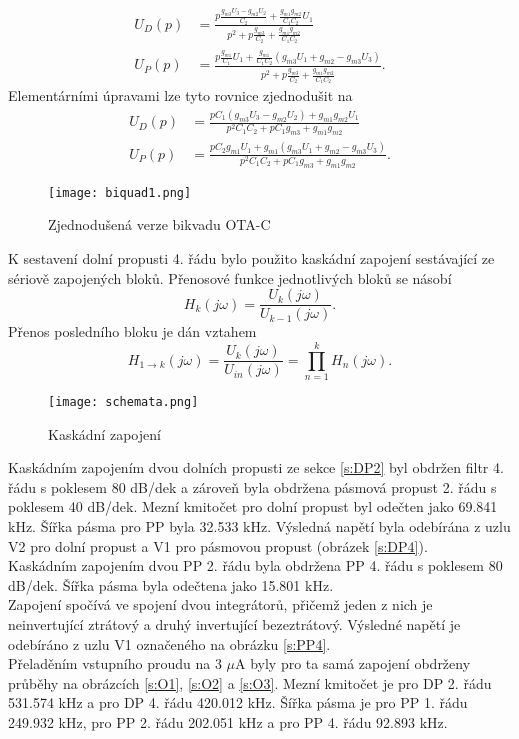 \begin{align}
U_D(p) &= \frac{p\frac{g_{m3}U_3-g_{m2}U_2}{C_2}+\frac{g_{m1}g_{m2}}{C_1C_2}U_1}{p^2 + p\frac{g_{m3}}{C_2} + \frac{g_{m1}g_{m2}}{C_1C_2}}\\
U_P(p) &= \frac{p\frac{g_{m1}}{C_1}U_1 + \frac{g_{m1}}{C_1C_2}(g_{m3}U_1+g_{m2}-g_{m3}U_3)}{p^2 + p\frac{g_{m3}}{C_2} + \frac{g_{m1}g_{m2}}{C_1C_2}}.
\end{align}
\noindent Elementárními úpravami lze tyto rovnice zjednodušit na
\begin{align}
U_D(p) &= \frac{pC_1(g_{m3}U_3 - g_{m2}U_2) + g_{m1}g_{m2}U_1}{p^2C_1C_2 + pC_1g_{m3} + g_{m1}g_{m2}}\\
U_P(p) &= \frac{pC_2g_{m1}U_1 + g_{m1}(g_{m3}U_1 + g_{m2} - g_{m3}U_3)}{p^2C_1C_2 + pC_1g_{m3} + g_{m1}g_{m2}}.
\end{align}
\begin{figure}[h]
\centering
\texttt{[image: biquad1.png]}
\caption[Zjednodušená verze bikvadu OTA-C]{Zjednodušená verze bikvadu OTA-C \cite{10} \label{s:BIK2}}
\end{figure}
\noindent K sestavení dolní propusti 4. řádu bylo použito kaskádní zapojení sestávající ze sériově zapojených bloků. Přenosové funkce jednotlivých bloků se násobí
\begin{equation}
H_k(j\omega) = \frac{U_k (j\omega)}{U_{k-1}(j\omega)}.
\end{equation}
Přenos posledního bloku je dán vztahem
\begin{equation}
H_{1 \rightarrow k}(j\omega) = \frac{U_k (j\omega)}{U_{in}(j\omega)} = \prod _{n=1}^{k} H_n(j\omega).
\end{equation}
\begin{figure}[h]
\centering
\texttt{[image: schemata.png]}
\caption[Kaskádní zapojení]{Kaskádní zapojení \cite{12}}
\end{figure}
Kaskádním zapojením dvou dolních propusti ze sekce \ref{s:DP2} byl obdržen filtr 4. řádu s poklesem 80 dB/dek a zároveň byla obdržena pásmová propust 2. řádu s poklesem 40 dB/dek. Mezní kmitočet pro dolní propust byl odečten jako 69.841 kHz. Šířka pásma pro PP byla 32.533 kHz. Výsledná napětí byla odebírána z uzlu V2 pro dolní propust a V1 pro pásmovou propust (obrázek \ref{s:DP4}). \\
\noindent Kaskádním zapojením dvou PP 2. řádu byla obdržena PP 4. řádu s poklesem 80 dB/dek. Šířka pásma byla odečtena jako 15.801 kHz.\\ Zapojení spočívá ve spojení dvou integrátorů, přičemž jeden z nich je neinvertující ztrátový a druhý invertující bezeztrátový. Výsledné napětí je odebíráno z uzlu V1 označeného na obrázku \ref{s:PP4}.\\
\noindent Přeladěním vstupního proudu na 3 $\mu$A byly pro ta samá zapojení obdrženy průběhy na obrázcích \ref{s:O1}, \ref{s:O2} a  \ref{s:O3}. Mezní kmitočet je pro DP 2. řádu 531.574 kHz a pro DP 4. řádu 420.012 kHz. Šířka pásma je pro PP 1. řádu 249.932 kHz, pro PP 2. řádu 202.051 kHz a pro PP 4. řádu 92.893 kHz.